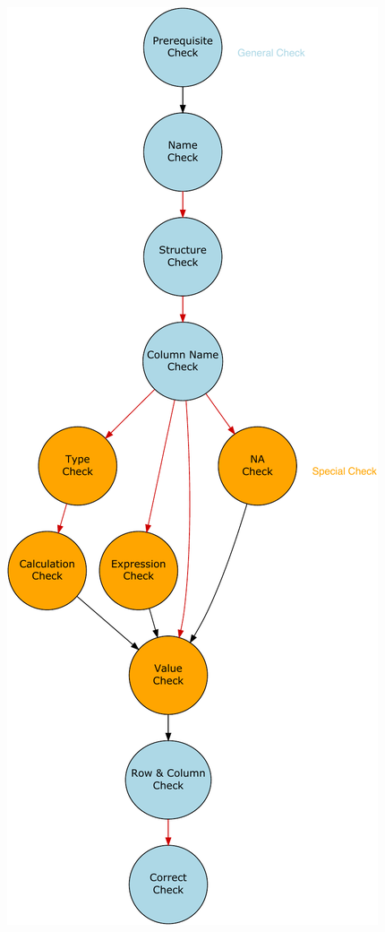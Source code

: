\documentclass[
  12pt,
]{book}
\begin{document}
\newpage

\begin{center}\includegraphics{UCSB-ECON145-AutograderManual_files/figure-latex/unnamed-chunk-28-1} \end{center}
\end{document}
